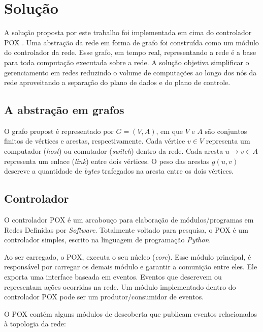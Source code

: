 \chapter{Solução}

A solução proposta por este trabalho foi implementada em cima do controlador
POX \citep{pox}. 
Uma abstração da rede em forma de grafo foi construída como um módulo 
do controlador da rede.
Esse grafo, em tempo real, representando a rede é a base para toda computação
executada sobre a rede.
A solução objetiva simplificar o gerenciamento em redes reduzindo o volume 
de computações ao longo dos nós da rede aproveitando a separação do plano 
de dados e do plano de controle.

\section{A abstração em grafos}

O grafo propost é representado por $G=(V, A)$, em que $V$ e $A$ são conjuntos
finitos de vértices e arestas, respectivamente.
Cada vértice $v \in V$ representa um computador (\emph{host}) ou comutador
(\emph{switch}) dentro da rede.
Cada aresta $u \to v \in A$ representa um enlace (\emph{link}) entre dois
vértices.
O peso das arestas $g(u, v)$ descreve a quantidade de \emph{bytes} trafegados
na aresta entre os dois vértices.

\section{Controlador}
\label{sec:controller}

O controlador POX é um arcabouço para elaboração de módulos/programas 
em Redes Definidas por \emph{Software}.
Totalmente voltado para pesquisa, o POX é um controlador simples, 
escrito na linguagem de programação \emph{Python}.

Ao ser carregado, o POX, executa o seu núcleo (\emph{core}). 
Esse módulo principal, é responsável por carregar os demais 
módulo e garantir a comunição entre eles.
Ele exporta uma interface baseada em eventos. 
Eventos que descrevem ou representam ações ocorridas na rede.
Um módulo implementado dentro do controlador POX pode ser um 
produtor/consumidor de eventos.

O POX contém alguns módulos de descoberta que publicam eventos relacionados
à topologia da rede:

